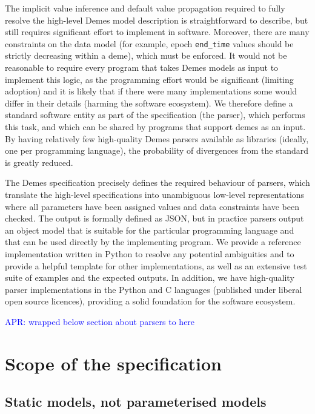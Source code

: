 \documentclass[11pt]{article}
\newcommand{\aprcomment}[1]{{\textcolor{blue}{APR: #1}}}
\begin{document}
The implicit value inference and default value propagation required to
fully resolve the high-level Demes model description is straightforward
to describe, but still requires significant effort to implement in
software. Moreover, there are many constraints on the data model
(for example, epoch \texttt{end\_time} values should be strictly decreasing
within a deme), which must be enforced.
It would not be reasonable to require every program that
takes Demes models as input to implement this logic, as the programming
effort would be significant (limiting adoption)
and it is likely that if there were many implementations some would differ
in their details (harming the software ecosystem).
We therefore define
a standard software entity as part of the specification (the parser),
which performs this task, and which can be shared by programs that
support demes as an input. By having relatively few high-quality Demes
parsers available as libraries (ideally, one per programming language),
the probability of divergences from the standard is greatly reduced.

The Demes specification precisely defines the required behaviour of parsers,
which translate the high-level specifications into unambiguous low-level
representations where all parameters have been assigned values and data
constraints have been checked. The output is formally defined as JSON, but in
practice parsers output an object model that is suitable for the particular
programming language and that can be used directly by the implementing program.
We provide a reference implementation written in Python to resolve any
potential ambiguities and to provide a helpful template for other
implementations, as well as an extensive test suite of examples and the
expected outputs. In addition, we have high-quality parser implementations in
the Python and C languages (published under liberal open source licences),
providing a solid foundation for the software ecosystem.

\aprcomment{wrapped below section about parsers to here}

\section{Scope of the specification}
\label{sec:appendix-scope}

\subsection{Static models, not parameterised models}
\label{sec:appendix-static}
\end{document}
